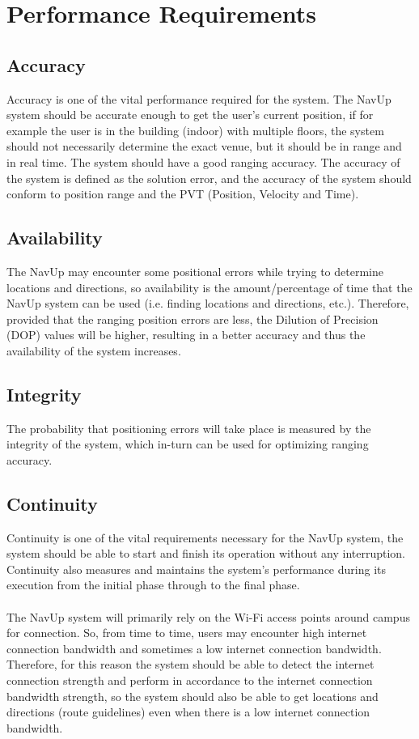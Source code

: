 \documentclass[12pt, a4paper]{article}
\begin{document}
\section{Performance Requirements}
	\subsection{Accuracy}
	Accuracy is one of the vital performance required for the system. The NavUp system should be accurate enough to get the user’s current position, if for example the user is in the building (indoor) with multiple floors, the system should not necessarily determine the exact venue, but it should be in range and in real time. The system should have a good ranging accuracy. The accuracy of the system is defined as the solution error, and the accuracy of the system should conform to position range and the PVT (Position, Velocity and Time).\\

	\subsection{Availability}
The NavUp may encounter some positional errors while trying to determine locations and directions, so availability is the amount/percentage of time that the NavUp system can be used (i.e. finding locations and directions, etc.). Therefore, provided that the ranging position errors are less, the Dilution of Precision (DOP) values will be higher, resulting in a better accuracy and thus the availability of the system increases.

	\subsection{Integrity}
The probability that positioning errors will take place is measured by the integrity of the system, which in-turn can be used for optimizing ranging accuracy.

	\subsection{Continuity}
Continuity is one of the vital requirements necessary for the NavUp system, the system should be able to start and finish its operation without any interruption. Continuity also measures and maintains the system’s performance during its execution from the initial phase through to the final phase.\\\\  
The NavUp system will primarily rely on the Wi-Fi access points around campus for connection. So, from time to time, users may encounter high internet connection bandwidth and sometimes a low internet connection bandwidth. Therefore, for this reason the system should be able to detect the internet connection strength and perform in accordance to the internet connection bandwidth strength, so the system should also be able to get locations and directions (route guidelines) even when there is a low internet connection bandwidth.
\end{document}
